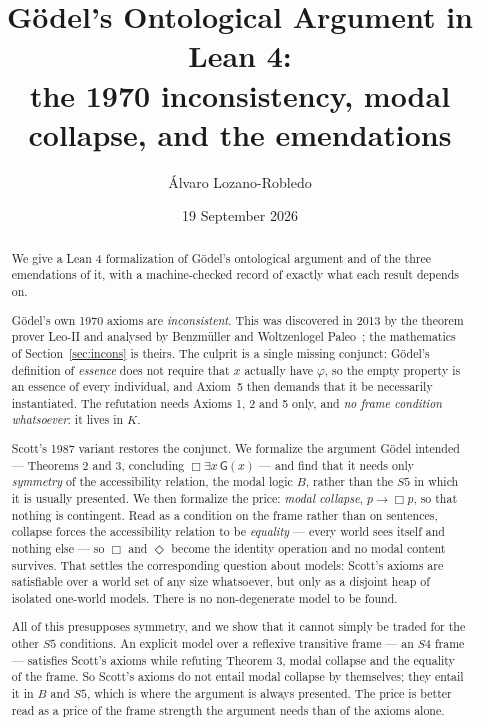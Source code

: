 \documentclass[11pt]{article}
\title{G\"odel's Ontological Argument in Lean 4:\\
       the 1970 inconsistency, modal collapse, and the emendations}
\author{\'Alvaro Lozano-Robledo}
\date{19 September 2026}
\theoremstyle{plain}
\theoremstyle{definition}
\newcommand{\Gd}{\mathsf{G}}
\begin{document}
\maketitle

\begin{abstract}
We give a Lean 4 formalization of G\"odel's ontological argument and of the
three emendations of it, with a machine-checked record of exactly what each
result depends on.

G\"odel's own 1970 axioms are \emph{inconsistent}. This was discovered in 2013
by the theorem prover Leo-II and analysed by Benzm\"uller and Woltzenlogel
Paleo~\cite{bwp2016}; the mathematics of Section~\ref{sec:incons} is theirs. The
culprit is a single missing conjunct: G\"odel's definition of \emph{essence}
does not require that $x$ actually have $\varphi$, so the empty property is an
essence of every individual, and Axiom~5 then demands that it be necessarily
instantiated. The refutation needs Axioms 1, 2 and 5 only, and \emph{no frame
condition whatsoever}: it lives in $K$.

Scott's 1987 variant restores the conjunct. We formalize the argument G\"odel
intended --- Theorems 2 and 3, concluding $\Box\exists x\,\Gd(x)$ --- and find
that it needs only \emph{symmetry} of the accessibility relation, the modal
logic $B$, rather than the $S5$ in which it is usually presented. We then
formalize the price: \emph{modal collapse}, $p \to \Box p$, so that nothing is
contingent. Read as a condition on the frame rather than on sentences, collapse
forces the accessibility relation to be \emph{equality} --- every world sees
itself and nothing else --- so $\Box$ and $\Diamond$ become the identity
operation and no modal content survives. That settles the corresponding
question about models: Scott's axioms are satisfiable over a world set of any
size whatsoever, but only as a disjoint heap of isolated one-world models.
There is no non-degenerate model to be found.

All of this presupposes symmetry, and we show that it cannot simply be traded
for the other $S5$ conditions. An
explicit model over a reflexive transitive frame --- an $S4$ frame --- satisfies
Scott's axioms while refuting Theorem 3, modal collapse and the equality of the
frame. So Scott's axioms do not entail modal collapse by themselves; they
entail it in $B$ and $S5$, which is where the argument is always presented. The
price is better read as a price of the frame strength the argument needs than
of the axioms alone.


\end{abstract}
\end{document}
